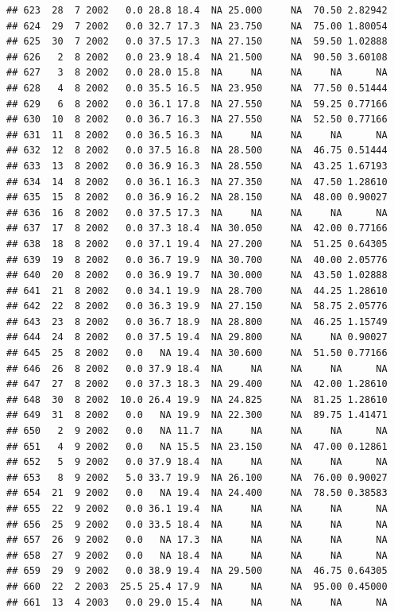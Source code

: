 \documentclass[
]{book}
\begin{document}
\begin{verbatim}
## 623  28  7 2002   0.0 28.8 18.4  NA 25.000     NA  70.50 2.82942
## 624  29  7 2002   0.0 32.7 17.3  NA 23.750     NA  75.00 1.80054
## 625  30  7 2002   0.0 37.5 17.3  NA 27.150     NA  59.50 1.02888
## 626   2  8 2002   0.0 23.9 18.4  NA 21.500     NA  90.50 3.60108
## 627   3  8 2002   0.0 28.0 15.8  NA     NA     NA     NA      NA
## 628   4  8 2002   0.0 35.5 16.5  NA 23.950     NA  77.50 0.51444
## 629   6  8 2002   0.0 36.1 17.8  NA 27.550     NA  59.25 0.77166
## 630  10  8 2002   0.0 36.7 16.3  NA 27.550     NA  52.50 0.77166
## 631  11  8 2002   0.0 36.5 16.3  NA     NA     NA     NA      NA
## 632  12  8 2002   0.0 37.5 16.8  NA 28.500     NA  46.75 0.51444
## 633  13  8 2002   0.0 36.9 16.3  NA 28.550     NA  43.25 1.67193
## 634  14  8 2002   0.0 36.1 16.3  NA 27.350     NA  47.50 1.28610
## 635  15  8 2002   0.0 36.9 16.2  NA 28.150     NA  48.00 0.90027
## 636  16  8 2002   0.0 37.5 17.3  NA     NA     NA     NA      NA
## 637  17  8 2002   0.0 37.3 18.4  NA 30.050     NA  42.00 0.77166
## 638  18  8 2002   0.0 37.1 19.4  NA 27.200     NA  51.25 0.64305
## 639  19  8 2002   0.0 36.7 19.9  NA 30.700     NA  40.00 2.05776
## 640  20  8 2002   0.0 36.9 19.7  NA 30.000     NA  43.50 1.02888
## 641  21  8 2002   0.0 34.1 19.9  NA 28.700     NA  44.25 1.28610
## 642  22  8 2002   0.0 36.3 19.9  NA 27.150     NA  58.75 2.05776
## 643  23  8 2002   0.0 36.7 18.9  NA 28.800     NA  46.25 1.15749
## 644  24  8 2002   0.0 37.5 19.4  NA 29.800     NA     NA 0.90027
## 645  25  8 2002   0.0   NA 19.4  NA 30.600     NA  51.50 0.77166
## 646  26  8 2002   0.0 37.9 18.4  NA     NA     NA     NA      NA
## 647  27  8 2002   0.0 37.3 18.3  NA 29.400     NA  42.00 1.28610
## 648  30  8 2002  10.0 26.4 19.9  NA 24.825     NA  81.25 1.28610
## 649  31  8 2002   0.0   NA 19.9  NA 22.300     NA  89.75 1.41471
## 650   2  9 2002   0.0   NA 11.7  NA     NA     NA     NA      NA
## 651   4  9 2002   0.0   NA 15.5  NA 23.150     NA  47.00 0.12861
## 652   5  9 2002   0.0 37.9 18.4  NA     NA     NA     NA      NA
## 653   8  9 2002   5.0 33.7 19.9  NA 26.100     NA  76.00 0.90027
## 654  21  9 2002   0.0   NA 19.4  NA 24.400     NA  78.50 0.38583
## 655  22  9 2002   0.0 36.1 19.4  NA     NA     NA     NA      NA
## 656  25  9 2002   0.0 33.5 18.4  NA     NA     NA     NA      NA
## 657  26  9 2002   0.0   NA 17.3  NA     NA     NA     NA      NA
## 658  27  9 2002   0.0   NA 18.4  NA     NA     NA     NA      NA
## 659  29  9 2002   0.0 38.9 19.4  NA 29.500     NA  46.75 0.64305
## 660  22  2 2003  25.5 25.4 17.9  NA     NA     NA  95.00 0.45000
## 661  13  4 2003   0.0 29.0 15.4  NA     NA     NA     NA      NA

\end{verbatim}
\end{document}
